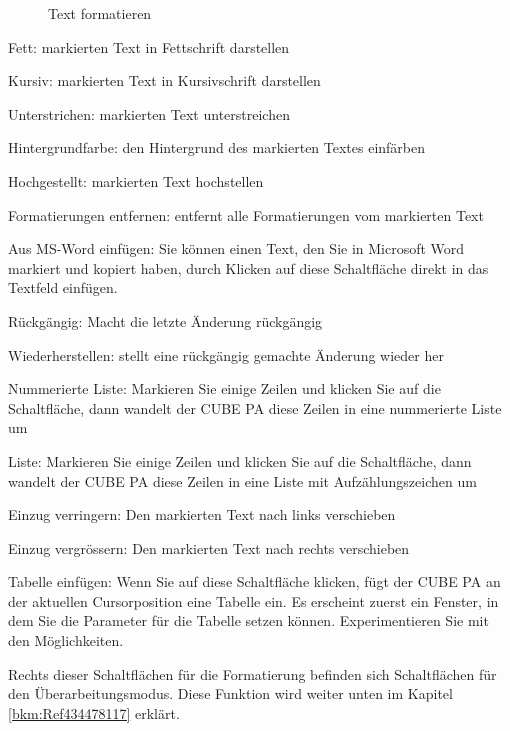 \begin{figure}[H]
\caption{Text formatieren}
\end{figure}

\begin{compactitem}
\item Fett: markierten Text in Fettschrift darstellen
\item Kursiv: markierten Text in Kursivschrift darstellen
\item Unterstrichen: markierten Text unterstreichen
\item Hintergrundfarbe: den Hintergrund des markierten Textes einfärben
\item Hochgestellt: markierten Text hochstellen
\item Formatierungen entfernen: entfernt alle Formatierungen vom markierten Text
\item Aus MS-Word einfügen: Sie können einen Text, den Sie in Microsoft Word markiert und kopiert haben, durch Klicken auf
diese Schaltfläche direkt in das Textfeld einfügen.
\item Rückgängig: Macht die letzte Änderung rückgängig
\item Wiederherstellen: stellt eine rückgängig gemachte Änderung wieder her
\item Nummerierte Liste: Markieren Sie einige Zeilen und klicken Sie auf die Schaltfläche, dann wandelt der CUBE PA diese
Zeilen in eine nummerierte Liste um
\item Liste: Markieren Sie einige Zeilen und klicken Sie auf die Schaltfläche, dann wandelt der CUBE PA diese Zeilen in eine
Liste mit Aufzählungszeichen um
\item Einzug verringern: Den markierten Text nach links verschieben
\item Einzug vergrössern: Den markierten Text nach rechts verschieben
\item Tabelle einfügen: Wenn Sie auf diese Schaltfläche klicken, fügt der CUBE PA an der aktuellen Cursorposition eine Tabelle
ein. Es erscheint zuerst ein Fenster, in dem Sie die Parameter für die Tabelle setzen können. Experimentieren Sie mit
den Möglichkeiten.
\end{compactitem}

\vspace{\baselineskip}

\begin{sloppypar}
Rechts dieser Schaltflächen für die Formatierung befinden sich Schaltflächen für den Überarbeitungsmodus. Diese Funktion wird weiter unten im Kapitel \ref{bkm:Ref434478117} erklärt.
\end{sloppypar}

